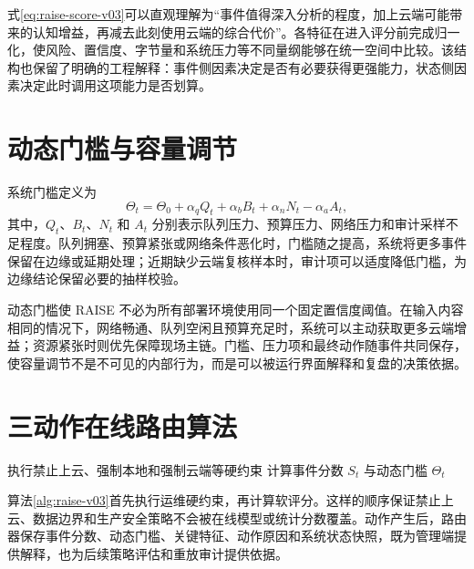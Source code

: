 式\eqref{eq:raise-score-v03}可以直观理解为“事件值得深入分析的程度，加上云端可能带来的认知增益，再减去此刻使用云端的综合代价”。各特征在进入评分前完成归一化，使风险、置信度、字节量和系统压力等不同量纲能够在统一空间中比较。该结构也保留了明确的工程解释：事件侧因素决定是否有必要获得更强能力，状态侧因素决定此时调用这项能力是否划算。

\section{动态门槛与容量调节}
系统门槛定义为
\begin{equation}
  \Theta_t = \Theta_0 + \alpha_q Q_t + \alpha_b B_t + \alpha_n N_t - \alpha_a A_t,
  \label{eq:raise-threshold-v03}
\end{equation}
其中，$Q_t$、$B_t$、$N_t$ 和 $A_t$ 分别表示队列压力、预算压力、网络压力和审计采样不足程度。队列拥塞、预算紧张或网络条件恶化时，门槛随之提高，系统将更多事件保留在边缘或延期处理；近期缺少云端复核样本时，审计项可以适度降低门槛，为边缘结论保留必要的抽样校验。

动态门槛使 RAISE 不必为所有部署环境使用同一个固定置信度阈值。在输入内容相同的情况下，网络畅通、队列空闲且预算充足时，系统可以主动获取更多云端增益；资源紧张时则优先保障现场主链。门槛、压力项和最终动作随事件共同保存，使容量调节不是不可见的内部行为，而是可以被运行界面解释和复盘的决策依据。

\section{三动作在线路由算法}
\begin{algorithm}[htbp]
  \caption{RAISE 三动作在线路由}
  \label{alg:raise-v03}
  执行禁止上云、强制本地和强制云端等硬约束\;
  计算事件分数 $S_t$ 与动态门槛 $\Theta_t$\;
\end{algorithm}

算法\ref{alg:raise-v03}首先执行运维硬约束，再计算软评分。这样的顺序保证禁止上云、数据边界和生产安全策略不会被在线模型或统计分数覆盖。动作产生后，路由器保存事件分数、动态门槛、关键特征、动作原因和系统状态快照，既为管理端提供解释，也为后续策略评估和重放审计提供依据。

